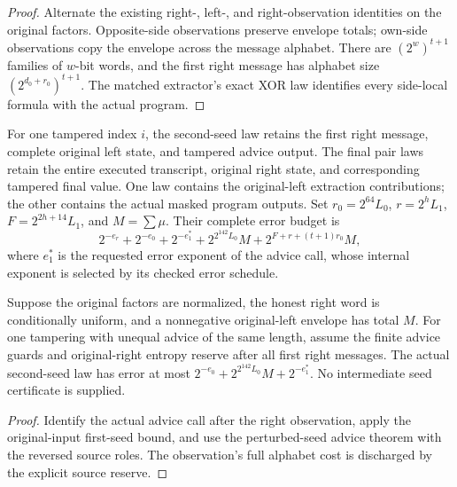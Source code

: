 \begin{proof}
  \leanok
  Alternate the existing right-, left-, and right-observation
  identities on the original factors. Opposite-side observations
  preserve envelope totals; own-side observations copy the envelope
  across the message alphabet. There are $(2^w)^{t+1}$ families
  of $w$-bit words, and the first right message has alphabet size
  $(2^{d_0+r_0})^{t+1}$. The matched extractor's exact XOR law
  identifies every side-local formula with the actual program.
\end{proof}

\begin{definition}
  \label{def:lowerbounds-algebraic-affine-phase-one-pair}
  \leanok
  For one tampered index $i$, the second-seed law retains the first
  right message, complete original left state, and tampered advice output.
  The final pair laws retain the entire executed transcript, original
  right state, and corresponding tampered final value. One law contains
  the original-left extraction contributions; the other contains the
  actual masked program outputs. Set
  $r_0=2^{64}L_0$, $r=2^hL_1$, $F=2^{2h+14}L_1$, and $M=\sum\mu$.
  Their complete error budget is
  \[
    2^{-e_r}+2^{-e_0}+2^{-e_1^*}
      +2^{2^{142}L_0}M+2^{F+r+(t+1)r_0}M,
  \]
  where $e_1^*$ is the requested error exponent of the advice call,
  whose internal exponent is selected by its checked error schedule.
\end{definition}

\begin{theorem}
  \label{thm:lowerbounds-algebraic-affine-phase-one-second}
  \leanok
  Suppose the original factors are normalized, the honest right word
  is conditionally uniform, and a nonnegative original-left envelope
  has total $M$. For one tampering with unequal advice of the same
  length, assume the finite advice guards and original-right entropy
  reserve after all first right messages. The actual second-seed law
  has error at most $2^{-e_0}+2^{2^{142}L_0}M+2^{-e_1^*}$.
  No intermediate seed certificate is supplied.
\end{theorem}
\begin{proof}
  \leanok
  Identify the actual advice call after the right observation, apply
  the original-input first-seed bound, and use the perturbed-seed
  advice theorem with the reversed source roles. The observation's
  full alphabet cost is discharged by the explicit source reserve.
\end{proof}

